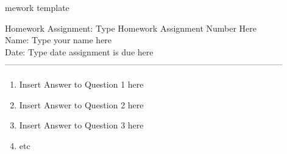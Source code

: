 
mework template %
\newcommand{\answer}[2]{ \newpage \noindent \framebox{
\vbox{
Homework \hfill {\bf \problemset}
\name \hfill \today \\ %
}
} \bigskip
}

Homework Assignment: Type Homework Assignment Number Here\\ Name: Type your name here\\ Date: Type date assignment is due here\\ --------------------------------------------------------------------------------------------------\begin {enumerate}
\item Insert Answer to Question 1 here \item Insert Answer to Question 2 here \item Insert Answer to Question 3 here \item etc \end {enumerate}

